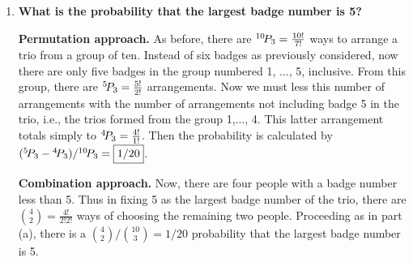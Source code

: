 \documentclass[10pt, oneside]{article}
\begin{document}
\begin{enumerate}[label=2.\arabic*]
\begin{enumerate}
	\textbf{Permutation approach.} There are $\Perm{10}{3} = \frac{10!}{7!}$ ways to arrange a trio from a group of ten. Now, there are six badges numbered 5,...,10, inclusive. Thus, there are $\Perm{6}{3} = \frac{6!}{3!}$ ways to arrange a trio involving the six highest numbers. The aim is to now determine how many of those trios actually contain 5. Since 5 is the lowest number in choosing only from this group, if the person with badge 5 is in the trio, then 5 will necessarily be the lowest number. Then the next step is to count the number of trios that do not contain badge 5; namely, the total arrangements of trios from the numbers 6, ..., 10. There are five such numbers, meaning there are $\Perm{5}{3} = \frac{5!}{2!}$ such trios. Less the total arrangements from the trios excluding 5 from the total arrangements of trios from the six highest numbers and divide by the total number of trios from the group of ten to calculate: $(\Perm{6}{3} - \Perm{5}{3}) / \Perm{10}{3} = \boxed{1/12}$.
	
	\textbf{Combination approach.} There are $\binom {10}{3} = \frac{10!}{3!7!}$ ways to choose 3 from a group of 10. Since there are five people with badges greater than 5, if 5 is fixed as the lowest badge number, then there are $\binom 52 = \frac{5!}{2! 3!}$ ways of choosing the remaining two people of those five. Ergo, there is a $\binom{5}{2} / \binom {10}{3} = \boxed{1/12}$ probability that the smallest badge number is 5.
	
	\item \begin{tcolorbox}[
  colback=Cerulean!5!white,
  colframe=Cerulean!75!black]
	\textbf{What is the probability that the largest badge number is 5?}
	\end{tcolorbox}
	
	\textbf{Permutation approach.} As before, there are $\Perm{10}{3} = \frac{10!}{7!}$ ways to arrange a trio from a group of ten. Instead of six badges as previously considered, now there are only five badges in the group numbered 1, ..., 5, inclusive. From this group, there are $\Perm{5}{3} = \frac{5!}{2!}$ arrangements. Now we must less this number of arrangements with the number of arrangements not including badge 5 in the trio, i.e., the trios formed from the group 1,..., 4. This latter arrangement totals simply to ${}^{4}\!P_{3} = \frac{4!}{1!}$. Then the probability is calculated by $({}^{5}\!P_{3} - {}^{4}\!P_{3}) / {}^{10}\!P_{3} = \boxed{1/20}$. 
	
	\textbf{Combination approach.} Now, there are four people with a badge number less than 5. Thus in fixing 5 as the largest badge number of the trio, there are $\binom 42 = \frac{4!}{2!2!}$ ways of choosing the remaining two people. Proceeding as in part (a), there is a $\binom{4}{2} / \binom {10}{3} = \boxed{1/20}$ probability that the largest badge number is 5.
	

\end{enumerate}
\end{enumerate}
\end{document}
